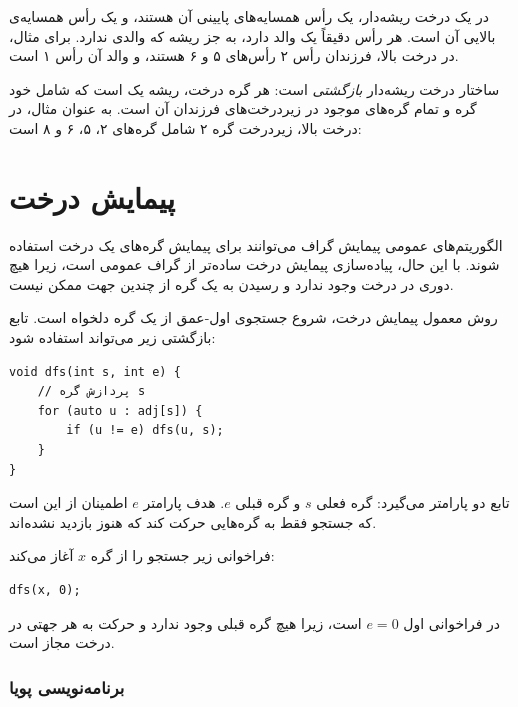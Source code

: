 در یک درخت ریشه‌دار،  یک رأس
همسایه‌های پایینی آن هستند، و  یک رأس
همسایه‌ی بالایی آن است.
هر رأس دقیقاً یک والد دارد،
به جز ریشه که والدی ندارد.
برای مثال، در درخت بالا،
فرزندان رأس ۲ رأس‌های ۵ و ۶ هستند،
و والد آن رأس ۱ است.


ساختار درخت ریشه‌دار \emph{بازگشتی} است:
هر گره درخت، ریشه یک  است
که شامل خود گره و تمام گره‌های
موجود در زیردرخت‌های فرزندان آن است.
به عنوان مثال، در درخت بالا، زیردرخت گره ۲
شامل گره‌های ۲، ۵، ۶ و ۸ است:
\begin{center}
\end{center}

\section{پیمایش درخت}

الگوریتم‌های عمومی پیمایش گراف
می‌توانند برای پیمایش گره‌های یک درخت استفاده شوند.
با این حال، پیاده‌سازی پیمایش درخت ساده‌تر از
گراف عمومی است، زیرا
هیچ دوری در درخت وجود ندارد و رسیدن
به یک گره از چندین جهت ممکن نیست.

روش معمول پیمایش درخت، شروع
جستجوی اول-عمق از یک گره دلخواه است.
تابع بازگشتی زیر می‌تواند استفاده شود:

\begin{lstlisting}
void dfs(int s, int e) {
    // پردازش گره s
    for (auto u : adj[s]) {
        if (u != e) dfs(u, s);
    }
}
\end{lstlisting}

تابع دو پارامتر می‌گیرد: گره فعلی $s$
و گره قبلی $e$.
هدف پارامتر $e$ اطمینان از این است
که جستجو فقط به گره‌هایی حرکت کند
که هنوز بازدید نشده‌اند.

فراخوانی زیر جستجو را
از گره $x$ آغاز می‌کند:

\begin{lstlisting}
dfs(x, 0);
\end{lstlisting}

در فراخوانی اول $e=0$ است، زیرا هیچ
گره قبلی وجود ندارد و حرکت
به هر جهتی در درخت مجاز است.

\subsubsection{برنامه‌نویسی پویا}

